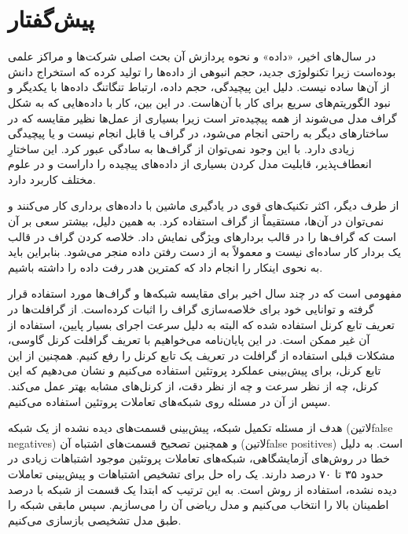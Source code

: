 \chapter*{پیش‌گفتار}

در سال‌های اخیر، «داده» و نحوه پردازش آن بحث اصلی شرکت‌ها و مراکز علمی بوده‌است زیرا تکنولوژی جدید، حجم انبوهی از داده‌ها را تولید کرده که استخراج دانش از آن‌ها سا‌ده نیست. دلیل این پیچیدگی، حجم داده، ارتباط تنگاتنگ داده‌ها با یکدیگر و نبود الگوریتم‌های سریع برای کار با آن‌هاست. در این بین، کار با داده‌هایی که به شکل گراف مدل می‌شوند از همه پیچیده‌تر است زیرا بسیاری از عمل‌ها نظیر مقایسه که در ساختار‌های دیگر به راحتی انجام می‌شود، در گراف یا قابل انجام نیست و یا پیچیدگی زیادی دارد. با این وجود نمی‌توان از گراف‌ها به سادگی عبور کرد. این ساختارِ انعطاف‌پذیر، قابلیت مدل کردن بسیاری از داده‌های پیچیده را داراست و در علوم مختلف کاربرد دارد.

از طرف دیگر، اکثر تکنیک‌های قوی در یادگیری ماشین با داده‌های برداری کار می‌کنند و نمی‌توان در آن‌ها، مستقیماً از گراف‌ استفاده کرد. به همین دلیل، بیشتر سعی بر آن است که گراف‌ها را در قالب بردارهای ویژگی نمایش داد. خلاصه کردن گراف در قالب یک بردار کار ساده‌ای نیست و معمولاً به از دست رفتن داده منجر می‌شود. بنابراین باید به نحوی اینکار را انجام داد که کمترین هدر رفت داده را داشته باشیم.

 مفهومی است که در چند سال اخیر برای مقایسه شبکه‌ها و گراف‌ها مورد استفاده قرار گرفته و توانایی خود برای خلاصه‌سازی گراف را اثبات کرده‌است. از گرافلت‌ها در تعریف تابع کرنل استفاده شده که البته به دلیل سرعت اجرای بسیار پایین، استفاده از آن غیر ممکن است. در این پایان‌نامه می‌خواهیم با تعریف گرافلت کرنل گاوسی، مشکلات قبلی استفاده از گرافلت در تعریف یک تابع کرنل را رفع کنیم. همچنین از این تابع کرنل، برای پیش‌بینی عملکرد پروتئین استفاده می‌کنیم و نشان می‌دهیم که این کرنل، چه از نظر سرعت و چه از نظر دقت، از کرنل‌های مشابه بهتر عمل می‌کند. سپس از آن در مسئله  روی شبکه‌های تعاملات پروتئین استفاده می‌کنیم.

هدف از مسئله تکمیل شبکه، پیش‌بینی قسمت‌های دیده نشده از یک شبکه (‌لاتین{false negatives}) و همچنین تصحیح قسمت‌های اشتباه آن (‌لاتین{false positives}) است. به دلیل خطا در روش‌های آزمایشگاهی، شبکه‌های تعاملات پروتئین موجود اشتباهات زیادی در حدود ۳۵ تا ۷۰ درصد دارند. یک راه حل برای تشخیص اشتباهات و پیش‌بینی تعاملات دیده نشده، استفاده از روش  است. به این ترتیب که ابتدا یک قسمت از شبکه با درصد اطمینان بالا را انتخاب می‌کنیم و مدل ریاضی آن را می‌سازیم. سپس مابقی شبکه را طبق مدل تشخیصی بازسازی می‌کنیم.